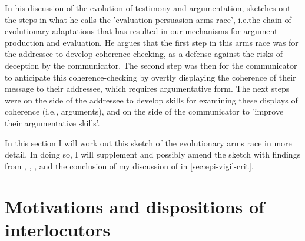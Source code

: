 In his discussion of the evolution of testimony and argumentation,\citet{Sperber01} sketches out the steps in what he calls the 'evaluation-persuasion arms race', i.e.\@ the chain of evolutionary adaptations that has resulted in our mechanisms for argument production and evaluation.
He argues that the first step in this arms race was for the addressee to develop coherence checking, as a defense against the risks of deception by the communicator. The second step was then for the communicator to anticipate this coherence-checking by overtly displaying the coherence of their message to their addressee, which requires argumentative form. The next steps were on the side of the addressee to develop skills for examining these displays of coherence (i.e., arguments), and on the side of the communicator to 'improve their argumentative skills'.

In this section I will work out this sketch of the evolutionary arms race in more detail. In doing so, I will supplement and possibly amend the sketch with findings from \citet{Sperber10}, \citet{MS11}, \citet{Reboul17}, and the conclusion of my discussion of \citet{Michaelian13} in \cref{sec:epi-vigil-crit}.


\section{Motivations and dispositions of interlocutors}

